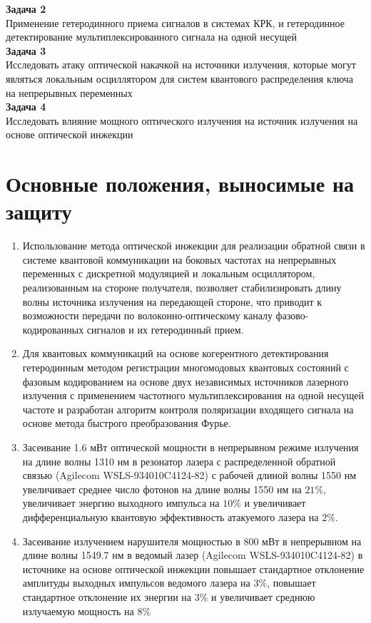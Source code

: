 \textbf{Задача 2}\\
Применение гетеродинного приема сигналов в системах КРК, и гетеродинное детектирование мультиплексированного сигнала на одной несущей\\

\textbf{Задача 3}\\
Исследовать атаку оптической накачкой на источники излучения, которые могут являться локальным осциллятором для систем квантового распределения ключа на непрерывных переменных\\

\textbf{Задача 4}\\
Исследовать влияние мощного оптического излучения на источник излучения на основе оптической инжекции\\

\section*{Основные положения, выносимые на защиту}
\begin{enumerate}
    \item Использование метода оптической инжекции для реализации обратной связи в системе квантовой коммуникации на боковых частотах на непрерывных переменных с дискретной модуляцией и локальным осциллятором, реализованным на стороне получателя, позволяет стабилизировать длину волны источника излучения на передающей стороне, что приводит к возможности передачи по волоконно-оптическому каналу фазово-кодированных сигналов и их гетеродинный прием.
    \item Для квантовых коммуникаций на основе когерентного детектирования гетеродинным методом регистрации многомодовых квантовых состояний с фазовым кодированием на основе двух независимых источников лазерного излучения с применением частотного мультиплексирования на одной несущей частоте и разработан алгоритм контроля поляризации входящего сигнала на основе метода быстрого преобразования Фурье. 
    \item Засеивание 1.6 мВт оптической мощности в непрерывном режиме излучения на длине волны 1310 нм в резонатор лазера с распределенной обратной связью (Agilecom WSLS-934010C4124-82) с рабочей длиной волны 1550 нм увеличивает среднее число фотонов на длине волны 1550 нм на $21\%$, увеличивает энергию выходного импульса на $10\%$ и увеличивает дифференциальную квантовую эффективность атакуемого лазера на $2\%$.
    \item Засеивание излучением нарушителя мощностью в 800 мВт в непрерывном на длине волны 1549.7 нм в ведомый лазер (Agilecom WSLS-934010C4124-82) в источнике на основе оптической инжекции повышает стандартное отклонение амплитуды выходных импульсов ведомого лазера на $3\%$, повышает стандартное отклонение их энергии на $3\%$ и увеличивает среднюю излучаемую мощность на $8\%$
\end{enumerate}
